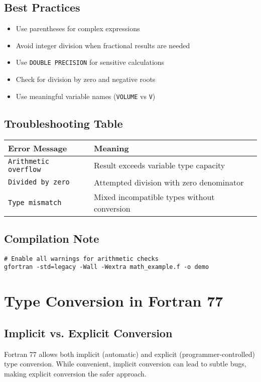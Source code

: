 \documentclass{book}
\begin{document}
\subsection*{Best Practices}
\begin{itemize}
    \item Use parentheses for complex expressions
    \item Avoid integer division when fractional results are needed
    \item Use \texttt{DOUBLE PRECISION} for sensitive calculations
    \item Check for division by zero and negative roots
    \item Use meaningful variable names (\texttt{VOLUME} vs \texttt{V})
\end{itemize}

\subsection*{Troubleshooting Table}
\begin{center}
\begin{tabular}{|p{4cm}|p{8cm}|}
\hline
\textbf{Error Message} & \textbf{Meaning} \\ 
\hline
\texttt{Arithmetic overflow} & Result exceeds variable type capacity \\
\hline
\texttt{Divided by zero} & Attempted division with zero denominator \\
\hline
\texttt{Type mismatch} & Mixed incompatible types without conversion \\
\hline
\end{tabular}
\end{center}

\subsection*{Compilation Note}
\begin{verbatim}
# Enable all warnings for arithmetic checks
gfortran -std=legacy -Wall -Wextra math_example.f -o demo
\end{verbatim}

\section{Type Conversion in Fortran 77}

\subsection*{Implicit vs. Explicit Conversion}
Fortran 77 allows both implicit (automatic) and explicit (programmer-controlled) type conversion. While convenient, implicit conversion can lead to subtle bugs, making explicit conversion the safer approach.
\end{document}
